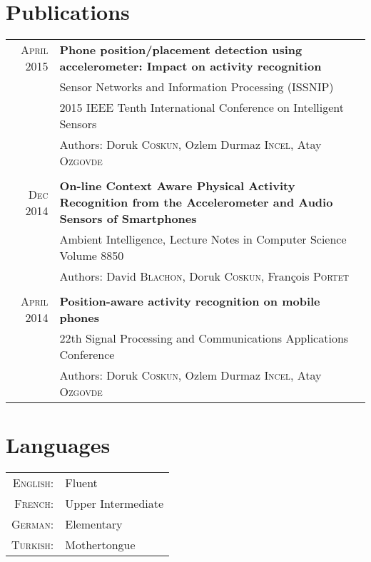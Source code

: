 \documentclass[a4paper,10pt]{article} %
\begin{document}

\section{Publications}

\begin{tabular}{r|p{14cm}}
\textsc{April} 2015 &\normalsize\textbf {Phone position/placement detection using accelerometer: Impact on activity recognition} \\
& Sensor Networks and Information Processing (ISSNIP) \\
& 2015 IEEE Tenth International Conference on Intelligent Sensors \\
& Authors: Doruk \textsc{Coskun}, Ozlem Durmaz \textsc{Incel}, Atay \textsc{Ozgovde} \normalsize\\ \\

\textsc{Dec} 2014 &\normalsize\textbf {On-line Context Aware Physical Activity Recognition from the Accelerometer and Audio Sensors of Smartphones} \\
& Ambient Intelligence, Lecture Notes in Computer Science Volume 8850 \\
& Authors: David \textsc{Blachon}, Doruk \textsc{Coskun}, François \textsc{Portet} \normalsize\\ \\

\textsc{April} 2014 &\normalsize\textbf {Position-aware activity recognition on mobile phones} \\
& 22th Signal Processing and Communications Applications Conference \\
& Authors: Doruk \textsc{Coskun}, Ozlem Durmaz \textsc{Incel}, Atay \textsc{Ozgovde}


\end{tabular}



\section{Languages}

\begin{tabular}{r|p{13cm}}
\textsc{English:} & Fluent\\

\textsc{French:} & Upper Intermediate\\

\textsc{German:} & Elementary\\

\textsc{Turkish:} & Mothertongue\\
\end{tabular}
\end{document}
